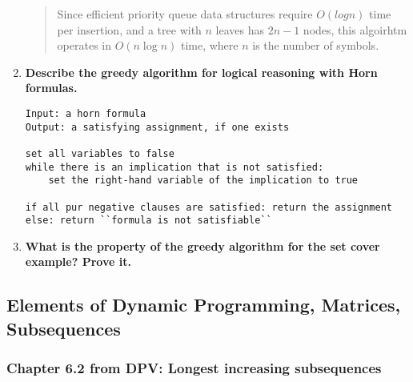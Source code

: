 \documentclass[a4paper,11pt]{article}
\begin{document}
\begin{enumerate}
  \begin{quote}
  Since efficient priority queue data structures require $O(log n)$ time
  per insertion, and a tree with $n$ leaves has $2n - 1$ nodes, this
  algoirhtm operates in $O(n \log n)$ time, where $n$ is the number of
  symbols.
  \end{quote}
\item
  \textbf{Describe the greedy algorithm for logical reasoning with Horn
  formulas.}

\begin{verbatim}
Input: a horn formula
Output: a satisfying assignment, if one exists

set all variables to false
while there is an implication that is not satisfied:
    set the right-hand variable of the implication to true

if all pur negative clauses are satisfied: return the assignment
else: return ``formula is not satisfiable``
\end{verbatim}
\item
  \textbf{What is the property of the greedy algorithm for the set cover
  example? Prove it.}
\end{enumerate}

\subsection{Elements of Dynamic Programming, Matrices,
Subsequences}\label{elements-of-dynamic-programming-matrices-subsequences}

\subsubsection{Chapter 6.2 from DPV: Longest increasing
subsequences}\label{chapter-6.2-from-dpv-longest-increasing-subsequences}
\end{document}
